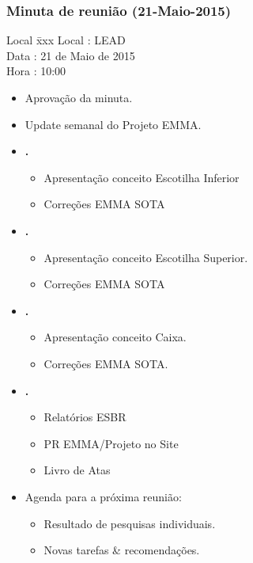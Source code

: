 \subsubsection{Minuta de reunião (21-Maio-2015)}

\begin{tabbing}
  Local \= xxx \kill
  Local \> : LEAD \\
  Data  \> : 21 de Maio de 2015 \\
  Hora  \> : 10:00
\end{tabbing}


  
\begin{itemize}
  \item Aprovação da minuta.

  \item Update semanal do Projeto EMMA.
  
  
    \item \textbf{\renan.} 
		\begin{itemize}    
			 \item Apresentação conceito Escotilha Inferior
			 \item Correções EMMA SOTA 
			
		\end{itemize}
		
		
    \item \textbf{\elael.} 
    		\begin{itemize}    
			 \item Apresentação conceito Escotilha Superior. 
			 \item Correções EMMA SOTA 
			\end{itemize}
					
			
    \item \textbf{\gabriel.} 
    		\begin{itemize}    
		 \item Apresentação conceito Caixa. 
		 \item Correções EMMA SOTA. 
			\end{itemize}

		 \item \textbf{\julia.} 
    		\begin{itemize}    
			 \item Relatórios ESBR
			 \item PR EMMA/Projeto no Site
			 \item Livro de Atas
		
			\end{itemize}


  \item Agenda para a próxima reunião:
  \begin{itemize}
    \item Resultado de pesquisas individuais.
    \item Novas tarefas \& recomendações.
  \end{itemize}

\end{itemize}

